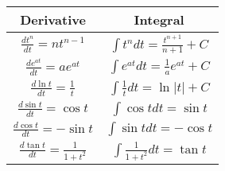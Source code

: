 \documentclass[10pt]{amsart}
\begin{document}
\vspace{0.2in}
\begin{tabular}{| c| c|}
\hline
Derivative & Integral \\
\hline
$ \frac{dt^{n}}{dt} = nt^{n-1}$		&$ \int t^{n} dt = \frac{t^{n+1}}{n+1} + C $ \\
$ \frac{de^{at}}{dt} = ae^{at}$		&$\int e^{at}dt = \frac{1}{a} e^{at} +C $ \\
$ \frac{d\ln t}{dt} = \frac{1}{t}$		&$\int \frac{1}{t} dt = \ln |t| + C$ \\
$ \frac{d \sin t}{dt} = \cos t$		&$\int \cos t dt  = \sin t $ \\
$ \frac{d \cos t}{dt} = -\sin t$		&$\int \sin t dt = -\cos t $ \\
$ \frac{d \tan t}{dt} = \frac{1}{1+t^{2}}$ &$\int \frac{1}{1+t^{2}}dt = \tan t$ \\
\hline
\end{tabular}



 
\end{document}
